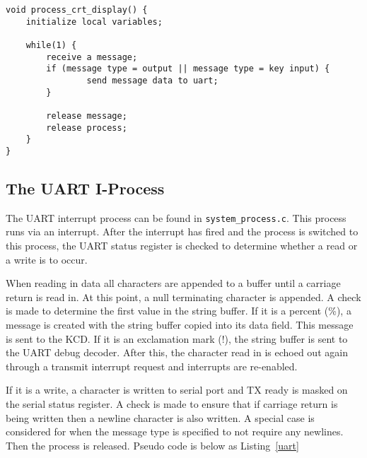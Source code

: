 \documentclass[oneside]{article}
\begin{document}
\begin{lstlisting}
void process_crt_display() {
    initialize local variables;

    while(1) {
        receive a message;
        if (message type = output || message type = key input) {
                send message data to uart;
        }
        
        release message;
        release process;
    }
}
\end{lstlisting}

\subsection*{The UART I-Process}
The UART interrupt process can be found in \texttt{system\_process.c}. This
process runs via an interrupt. After the interrupt has fired and the process is
switched to this process, the UART status register is checked to determine
whether a read or a write is to occur. 

When reading in data all characters are appended to a buffer until a carriage
return is read in. At this point, a null terminating character is appended.  A
check is made to determine the first value in the string buffer. If it is a
percent (\%), a message is created with the string buffer copied into its data
field. This message is sent to the KCD. If it is an exclamation mark (!), the
string buffer is sent to the UART debug decoder. After this, the character read
in is echoed out again through a transmit interrupt request and interrupts are
re-enabled. 

If it is a write, a character is written to serial port and TX ready is masked
on the serial status register.  A check is made to ensure that if carriage
return is being written then a newline character is also written. A special
case is considered for when the message type is specified to not require any
newlines. Then the process is released. Pseudo code is below as
Listing~\ref{uart}
\end{document}

